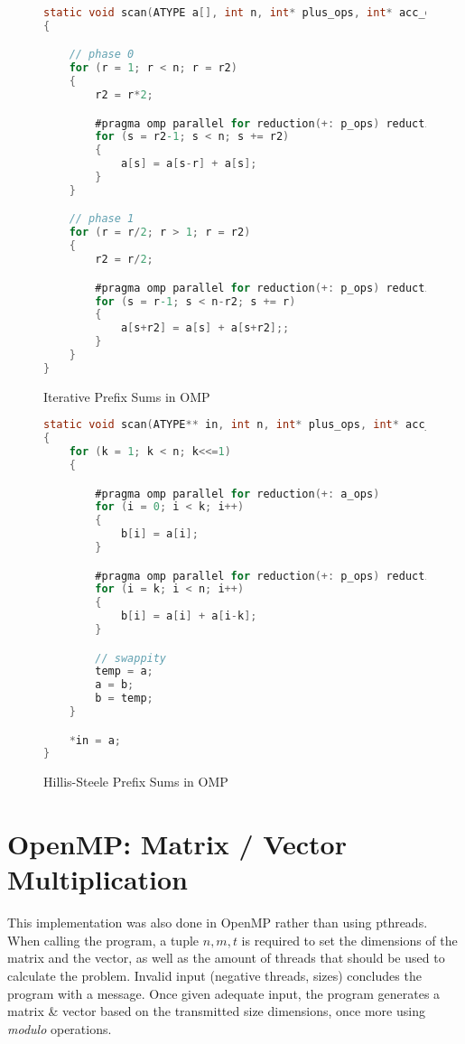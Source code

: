 \documentclass[11pt]{article}
\begin{document}
\begin{figure}[h]
\label{omp_prefix_iterative_code}
\caption{Iterative Prefix Sums in OMP}

\begin{lstlisting}[language=C]
static void scan(ATYPE a[], int n, int* plus_ops, int* acc_ops)
{

	// phase 0
	for (r = 1; r < n; r = r2)
	{
		r2 = r*2;

		#pragma omp parallel for reduction(+: p_ops) reduction(+: a_ops)
		for (s = r2-1; s < n; s += r2)
		{
			a[s] = a[s-r] + a[s];
		}
	}

	// phase 1
	for (r = r/2; r > 1; r = r2)
	{
		r2 = r/2;

		#pragma omp parallel for reduction(+: p_ops) reduction(+: a_ops)
		for (s = r-1; s < n-r2; s += r)
		{
			a[s+r2] = a[s] + a[s+r2];;
		}
	}
}
\end{lstlisting}
\end{figure}


\begin{figure}[h]
\label{omp_prefix_hillis_steele_code}
\caption{Hillis-Steele Prefix Sums in OMP}

\begin{lstlisting}[language=C]
static void scan(ATYPE** in, int n, int* plus_ops, int* acc_ops)
{
	for (k = 1; k < n; k<<=1) 
	{

		#pragma omp parallel for reduction(+: a_ops)
		for (i = 0; i < k; i++)
		{
			b[i] = a[i];
		}

		#pragma omp parallel for reduction(+: p_ops) reduction(+: a_ops)
		for (i = k; i < n; i++)
		{
			b[i] = a[i] + a[i-k];
		}

		// swappity
		temp = a;
		a = b;
		b = temp;
	}

	*in = a;
}
\end{lstlisting}
\end{figure}


\section{OpenMP: Matrix / Vector Multiplication}
This implementation was also done in OpenMP rather than using pthreads. When calling the program, a tuple $n, m, t$ is required to set the dimensions of the matrix and the vector, as well as the amount of threads that should be used to calculate the problem. Invalid input (negative threads, sizes) concludes the program with a message.
Once given adequate input, the program generates a matrix \& vector based on the transmitted size dimensions, once more using \emph{modulo} operations.
\end{document}
